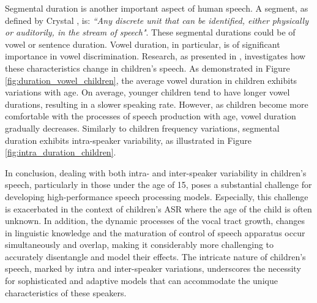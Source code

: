 Segmental duration is another important aspect of human speech. A segment, as defined by Crystal \cite{segment_definition}, is: \textit{``Any discrete unit that can be identified, either physically or auditorily, in the stream of speech"}. These segmental durations could be of vowel or sentence duration. Vowel duration, in particular, is of significant importance in vowel discrimination. Research, as presented in \cite{Acoustic_change_children}, investigates how these characteristics change in children's speech. As demonstrated in Figure \ref{fig:duration_vowel_children}, the average vowel duration in children exhibits variations with age. On average, younger children tend to have longer vowel durations, resulting in a slower speaking rate. However, as children become more comfortable with the processes of speech production with age, vowel duration gradually decreases. Similarly to children frequency variations, segmental duration exhibits intra-speaker variability, as illustrated in Figure \ref{fig:intra_duration_children}.


In conclusion, dealing with both intra- and inter-speaker variability in children's speech, particularly in those under the age of 15, poses a substantial challenge for developing high-performance speech processing models. Especially, this challenge is exacerbated in the context of children's \ac{ASR} where the age of the child is often unknown. In addition, the dynamic processes of the vocal tract growth, changes in linguistic knowledge and the maturation of control of speech apparatus occur simultaneously and overlap, making it considerably more challenging to accurately disentangle and model their effects. The intricate nature of children's speech, marked by intra and inter-speaker variations, underscores the necessity for sophisticated and adaptive models that can accommodate the unique characteristics of these speakers.



